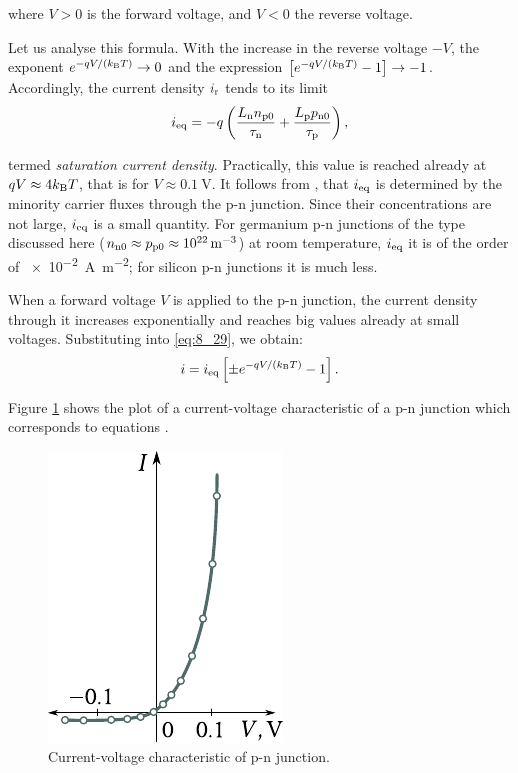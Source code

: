 \noindent
where $V>0$ is the forward voltage, and $V<0$ the reverse voltage.

Let us analyse this formula. With the increase in the reverse voltage $-V$, the exponent $e^{-qV/(k_{\text{B}}T)}\to 0$ and the expression $\left[e^{-qV/(k_{\text{B}}T)} - 1\right]\to -1$. Accordingly, the current density $i_{\text{r}}$ tends to its limit
\begin{equation}\label{eq:8_30}
	i_{\text{eq}} = - q \left( \frac{L_{\text{n}} n_{\text{p$0$}}}{\tau_{\text{n}}} + \frac{L_{\text{p}} p_{\text{n$0$}}}{\tau_{\text{p}}} \right),
\end{equation}

\noindent
termed \textit{saturation current density}. Practically, this value is reached already at $qV\approx 4k_{\text{B}}T$, that is for $V\approx\SI{0.1}{\volt}$. It follows from , that $i_{\text{eq}}$ is determined by the minority carrier fluxes through the p-n junction. Since their concentrations are not large, $i_{\text{eq}}$ is a small quantity.
For germanium p-n junctions of the type discussed here ($n_{\text{n$0$}}\approx p_{\text{p$0$}}\approx\SI{e22}{\per\metre\cubed}$) at room temperature, $i_{\text{eq}}$ it is of the order of \SI{e-2}{\ampere\per\metre\squared}; for silicon p-n junctions it is much less.

When a forward voltage $V$ is applied to the p-n junction, the current density through it increases exponentially and reaches big values already at small voltages. Substituting  into \eqref{eq:8_29}, we obtain:
\begin{equation}\label{eq:8_31}
	i = i_{\text{eq}} \left[\pm e^{-qV/(k_{\text{B}}T)} - 1\right].
\end{equation}

Figure \ref{fig:8_15} shows the plot of a current-voltage characteristic of a p-n junction which corresponds to equations .

\begin{figure}[t]
	\begin{center}
		\includegraphics[scale=1.0]{figures/ch_08/fig_8_15.pdf}
		\caption[]{Current-voltage characteristic of p-n junction.}
		\label{fig:8_15}
	\end{center}
	\vspace{-0.8cm}
\end{figure}

